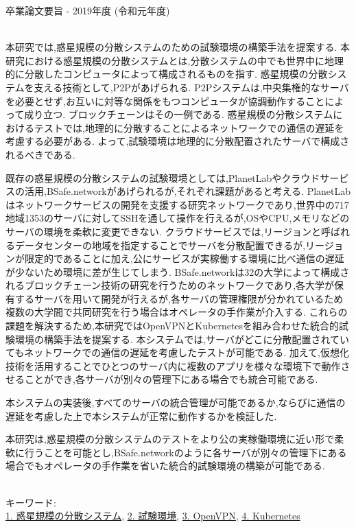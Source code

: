 卒業論文要旨 - 2019年度 (令和元年度)
\begin{center}
\begin{large}
\end{large}
\end{center}

~ \\
本研究では,惑星規模の分散システムのための試験環境の構築手法を提案する.
本研究における惑星規模の分散システムとは,分散システムの中でも世界中に地理的に分散したコンピュータによって構成されるものを指す.
惑星規模の分散システムを支える技術として,P2Pがあげられる.
P2Pシステムは,中央集権的なサーバを必要とせず,お互いに対等な関係をもつコンピュータが協調動作することによって成り立つ.
ブロックチェーンはその一例である.
惑星規模の分散システムにおけるテストでは,地理的に分散することによるネットワークでの通信の遅延を考慮する必要がある.
よって,試験環境は地理的に分散配置されたサーバで構成されるべきである.

既存の惑星規模の分散システムの試験環境としては,PlanetLabやクラウドサービスの活用,BSafe.networkがあげられるが,それぞれ課題があると考える.
PlanetLabはネットワークサービスの開発を支援する研究ネットワークであり,世界中の717地域1353のサーバに対してSSHを通して操作を行えるが,OSやCPU,メモリなどのサーバの環境を柔軟に変更できない.
クラウドサービスでは,リージョンと呼ばれるデータセンターの地域を指定することでサーバを分散配置できるが,リージョンが限定的であることに加え,公にサービスが実稼働する環境に比べ通信の遅延が少ないため環境に差が生じてしまう.
BSafe.networkは32の大学によって構成されるブロックチェーン技術の研究を行うためのネットワークであり,各大学が保有するサーバを用いて開発が行えるが,各サーバの管理権限が分かれているため複数の大学間で共同研究を行う場合はオペレータの手作業が介入する.
これらの課題を解決するため,本研究ではOpenVPNとKubernetesを組み合わせた統合的試験環境の構築手法を提案する.
本システムでは,サーバがどこに分散配置されていてもネットワークでの通信の遅延を考慮したテストが可能である.
加えて,仮想化技術を活用することでひとつのサーバ内に複数のアプリを様々な環境下で動作させることができ,各サーバが別々の管理下にある場合でも統合可能である.

本システムの実装後,すべてのサーバの統合管理が可能であるか,ならびに通信の遅延を考慮した上で本システムが正常に動作するかを検証した.

本研究は,惑星規模の分散システムのテストをより公の実稼働環境に近い形で柔軟に行うことを可能とし,BSafe.networkのように各サーバが別々の管理下にある場合でもオペレータの手作業を省いた統合的試験環境の構築が可能である.

~ \\
キーワード:\\
\underline{1. 惑星規模の分散システム},
\underline{2. 試験環境},
\underline{3. OpenVPN},
\underline{4. Kubernetes}

\begin{flushright}
\dept \\
\author
\end{flushright}
